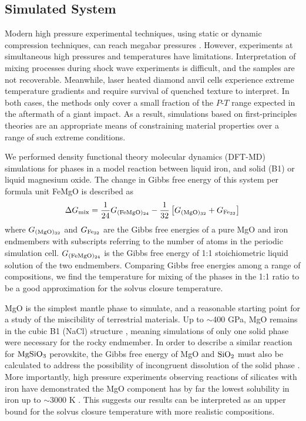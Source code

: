 \subsection{Simulated System}

Modern high pressure experimental techniques, using static or dynamic compression
techniques, can reach megabar pressures \citep{Boehler2000}. However, experiments at
simultaneous high pressures and temperatures have limitations. Interpretation of mixing
processes during shock wave experiments is difficult, and the samples are not
recoverable. Meanwhile, laser heated diamond anvil cells experience extreme temperature
gradients and require survival of quenched texture to interpret. In both cases, the
methods only cover a small fraction of the $P$-$T$ range expected in the aftermath of a
giant impact.  As a result, simulations based on first-principles theories are an
appropriate means of constraining material properties over a range of such extreme
conditions. 

We performed density functional theory molecular dynamics (DFT-MD) simulations for phases
in a model reaction between liquid iron, and solid (B1) or liquid magnesium oxide. The
change in Gibbs free energy of this system per formula unit FeMgO is described as
\begin{equation} \label{eqn:gibbs}
  \Delta G_{\rm{\rm mix}}  =  \frac{1}{24}G_{\rm{(FeMgO)_{24}}} 
- \frac{1}{32} \left[  G_{\rm{(MgO)_{32}}}  + G_{\rm{Fe_{32}}} \right]
\end{equation}
where $G_{\rm{(MgO)_{32}}}$ and   $G_{\rm{Fe_{32}}}$ are the Gibbs free energies of a
pure MgO and iron endmembers with subscripts referring to the number of atoms in the
periodic simulation cell. $G_{\rm{(FeMgO)_{24}}}$ is the Gibbs free energy of 1:1
stoichiometric liquid solution of the two endmembers. Comparing Gibbs free energies among
a range of compositions, we find the temperature for mixing of the phases in the
1:1 ratio to be a good approximation for the solvus closure temperature.

MgO is the simplest mantle phase to simulate, and a reasonable starting point for a study
of the miscibility of terrestrial materials. Up to $\sim$400 GPa, MgO remains in the
cubic B1 (NaCl) structure \citep{Boates2013}, meaning simulations of only one solid phase
were necessary for the rocky endmember. In order to describe a similar reaction for ${\rm
MgSiO_3}$ perovskite, the Gibbs free energy of MgO and ${\rm SiO_2}$ must also be
calculated to address the possibility of incongruent dissolution of the solid phase
\citep{Boates2013}. More importantly, high pressure experiments observing reactions of
silicates with iron have demonstrated the MgO component has by far the lowest solubility
in iron up to $\sim$3000 K \citep{Knittle1991,Ozawa2008a}. This suggests our results  can
be interpreted as an upper bound for the solvus closure temperature with more realistic
compositions. 

